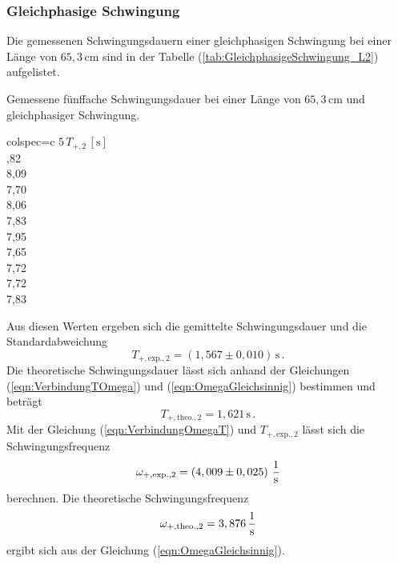 \subsubsection{Gleichphasige Schwingung}
\label{sec:GleichphasigeSchwingung_LangesPendel}
Die gemessenen Schwingungsdauern einer gleichphasigen Schwingung bei einer Länge von $65,3\, \unit{\centi\meter}$ sind in der Tabelle (\ref{tab:GleichphasigeSchwingung_L2})
aufgelistet. 
\begin{table}[H]
  \centering
  \caption{Gemessene fünffache Schwingungsdauer bei einer Länge von $65,3\, \unit{\centi\meter}$ und gleichphasiger Schwingung.}
  \label{tab:GleichphasigeSchwingung_L2}
  \begin{tblr}{colspec={c}}
      \toprule
      $5\, T_{+, 2}\,\left[\unit{\second}\right]$\\
      ,82 \\
      8,09 \\
      7,70 \\
      8,06 \\
      7,83 \\
      7,95 \\
      7,65 \\
      7,72 \\
      7,72 \\
      7,83 \\
      \bottomrule
  \end{tblr}
\end{table}
Aus diesen Werten ergeben sich die gemittelte Schwingungsdauer und die Standardabweichung
$$T_{+,\text{exp.},2} = \left( 1,567 \pm 0,010 \right)\, \unit{\second}\,.$$
Die theoretische Schwingungsdauer lässt sich anhand der Gleichungen (\ref{eqn:VerbindungTOmega}) und (\ref{eqn:OmegaGleichsinnig}) bestimmen und beträgt
$$T_{+,\text{theo.},2} = 1,621\, \unit{\second}\,.$$
Mit der Gleichung (\ref{eqn:VerbindungOmegaT}) und $T_{+,\text{exp.},2}$ lässt sich die Schwingungsfrequenz
$$\omega_{+,\text{exp.},2} = \left( 4,009 \pm 0,025 \right)\, \unit[per-mode=fraction]{\per\second}$$ berechnen. 
Die theoretische Schwingungsfrequenz
$$\omega_{+,\text{theo.},2} = 3,876 \, \unit[per-mode=fraction]{\per\second}$$ ergibt sich aus der Gleichung (\ref{eqn:OmegaGleichsinnig}).

%
%
